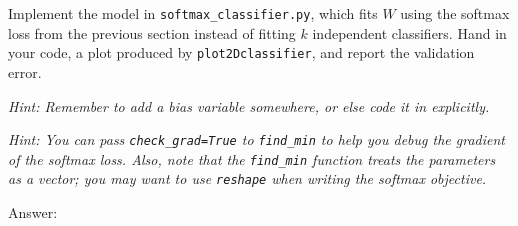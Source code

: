 \documentclass{article}
\newcommand{\ask}[1]{\textcolor{question}{#1}}
\newenvironment{answer}{\par\begingroup\color{answer}Answer: }{\endgroup}
\newcommand{\hint}[1]{\textcolor{black!60!white}{\emph{Hint: #1}}}
\newcommand{\TODO}{\color{red}{TODO}}
\begin{document}
Implement the model in \verb|softmax_classifier.py|, which fits $W$ using the softmax loss from the previous section instead of fitting $k$ independent classifiers. \ask{Hand in your code, a plot produced by \texttt{plot2Dclassifier}, and report the validation error}.

\hint{Remember to add a bias variable somewhere, or else code it in explicitly.}

\hint{You can pass \texttt{check\_grad=True} to \texttt{find\_min}
to help you debug the gradient of the softmax loss.
Also, note that the \texttt{find\_min} function treats the parameters as a vector;
you may want to use \texttt{reshape} when writing the softmax objective.}

\begin{answer}\TODO\end{answer}
\end{document}
